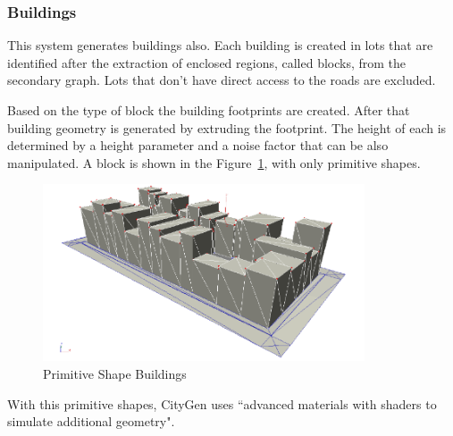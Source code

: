 \subsubsection{Buildings} %
\label{ssub:buildings}



This system generates buildings also. Each building is created in lots that are identified after the extraction of enclosed regions, called blocks, from the secondary graph. Lots that don't have direct access to the roads are excluded. 


Based on the type of block the building footprints are created. After that building geometry is generated by extruding the footprint. The height of each is determined by a height parameter and a noise factor that can be also manipulated. A block is shown in the Figure~\ref{fig:primitiveShapes}, with only primitive shapes.

\begin{figure}[htbp]
	\centering
	\includegraphics[width=0.85\textwidth]{img/CityGen/BockPrimitiveShapes.png}
	\caption{Primitive Shape Buildings}
	\label{fig:primitiveShapes}
\end{figure}

With this primitive shapes, CityGen uses ``advanced materials with shaders to simulate additional geometry".



